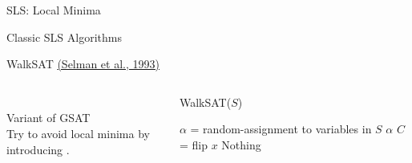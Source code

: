 \documentclass[t]{sdqbeamer}
\begin{document}
\begin{frame}{SLS: Local Minima}
\begin{center}
\end{center}
\begin{small}
\end{small}
\end{frame}
	
\begin{frame}{Classic SLS Algorithms}
\begin{block}{WalkSAT \href{https://web2.qatar.cmu.edu/~gdicaro/15281/additional/dimacs93-walksat.pdf}{(Selman et al., 1993)}}
\setlength\columnsep{1ex}
\begin{columns}[T]
	\begin{column}{.3\linewidth}
		~\\ Variant of GSAT\\[1em]
		Try to avoid local minima by introducing .
	\end{column}
	\begin{column}{.6\linewidth}
	\begin{algorithm}[H]
		\DontPrintSemicolon
		\caption{WalkSAT($S$)}
		 {
			$\alpha$ = random-assignment to variables in $S$ \;
			 {
				 {
					\Return $\alpha$
				}
				$C$ =  \;
				 {
					flip $x$
				}
			}
		}
		\Return Nothing 
	\end{algorithm}
	\end{column}
\end{columns}
\end{block}
\end{frame}
	
\end{document}
